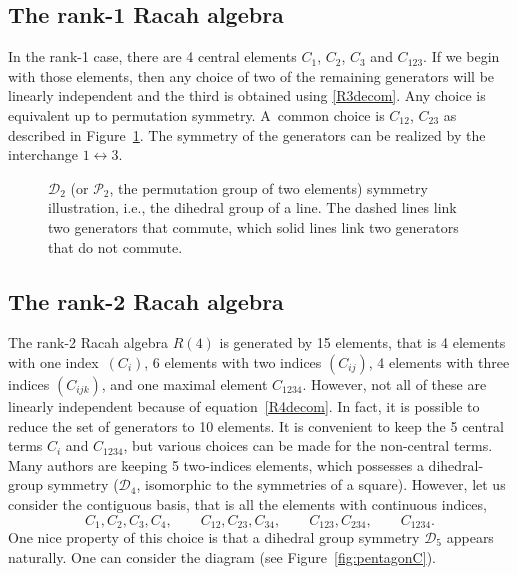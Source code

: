 \documentclass[pdftex]{sigma}
\numberwithin{equation}{section}
\begin{document}
\subsection{The rank-1 Racah algebra}
In the rank-1 case, there are 4 central elements $C_1$, $C_2$, $C_3$ and $C_{123}$. If we begin with those elements, then any choice of two of the remaining generators will be linearly independent and the third is obtained using \eqref{R3decom}. Any choice is equivalent up to permutation symmetry. A~common choice is $C_{12}$, $C_{23}$ as described in Figure~\ref{fig:pentagonC-1}. The symmetry of the generators can be realized by the interchange $1\longleftrightarrow 3$.


\begin{figure}[t]
\centering
{}
\caption{$\mathcal{D}_2$ (or $\mathcal{P}_2$, the permutation group of two elements) symmetry illustration, i.e., the dihedral group of a line. The dashed lines link two generators that commute, which solid lines link two generators that do not commute.}
\label{fig:pentagonC-1}
\end{figure}


\subsection{The rank-2 Racah algebra}
The rank-2 Racah algebra $R(4)$ is generated by 15 elements, that is 4 elements with one index~$(C_i)$, 6 elements with two indices $(C_{ij})$, 4 elements with three indices $(C_{ijk})$, and one maximal element $C_{1234}$. However, not all of these are linearly independent because of equation~\eqref{R4decom}. In fact, it is possible to reduce the set of generators to 10 elements. It is convenient to keep the 5 central terms $C_i$ and $C_{1234}$, but various choices can be made for the non-central terms. Many authors are keeping 5 two-indices elements, which possesses a dihedral-group symmetry ($\mathcal{D}_4$, isomorphic to the symmetries of a square). However, let us consider the contiguous basis, that is all the elements with continuous indices,
\[
C_1,C_2,C_3,C_4,\qquad C_{12},C_{23},C_{34},\qquad C_{123},C_{234},\qquad C_{1234}.
\]
One nice property of this choice is that a dihedral group symmetry $\mathcal{D}_5$ appears naturally. One can consider the diagram (see Figure~\ref{fig:pentagonC}).
\end{document}

